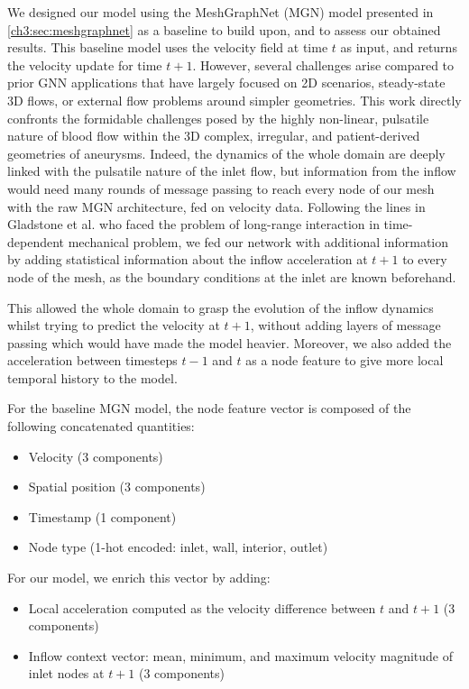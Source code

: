 We designed our model using the MeshGraphNet (MGN) model \cite{pfaff_learning_2021} presented in \autoref{ch3:sec:meshgraphnet} as a baseline to build upon, and to assess our obtained results. This baseline model uses the velocity field at time $t$ as input, and returns the velocity update for time $t+1$. However, several challenges arise compared to prior GNN applications that have largely focused on 2D scenarios, steady-state 3D flows, or external flow problems around simpler geometries. This work directly confronts the formidable challenges posed by the highly non-linear, pulsatile nature of blood flow within the 3D complex, irregular, and patient-derived geometries of aneurysms.  Indeed, the dynamics of the whole domain are deeply linked with the pulsatile nature of the inlet flow, but information from the inflow would need many rounds of message passing to reach every node of our mesh with the raw MGN architecture, fed on velocity data. Following the lines in Gladstone et al. \cite{gladstone_gnn-based_2023} who faced the problem of long-range interaction in time-dependent mechanical problem, we fed our network with additional information by adding statistical information about the inflow acceleration at $t+1$ to every node of the mesh, as the boundary conditions at the inlet are known beforehand.

This allowed the whole domain to grasp the evolution of the inflow dynamics whilst trying to predict the velocity at $t+1$, without adding layers of message passing which would have made the model heavier. Moreover, we also added the acceleration between timesteps $t-1$ and $t$ as a node feature to give more local temporal history to the model.

For the baseline MGN model, the node feature vector is composed of the following concatenated quantities:
\begin{itemize}
    \item Velocity (3 components)
    \item Spatial position (3 components)
    \item Timestamp (1 component)
    \item Node type (1-hot encoded: inlet, wall, interior, outlet)
\end{itemize}

For our model, we enrich this vector by adding:
\begin{itemize}

    \item Local acceleration computed as the velocity difference between $t$ and $t+1$ (3 components)
    \item Inflow context vector: mean, minimum, and maximum velocity magnitude of inlet nodes at $t+1$ (3 components)
\end{itemize}

